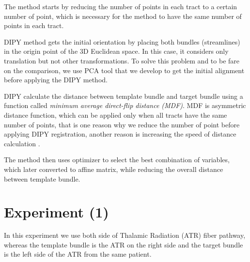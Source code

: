 \documentclass[../structure.tex]{subfiles}
\begin{document}
The method starts by reducing the number of points in each tract to a certain number of point, which is necessary for the method to have the same number of points in each tract.

DIPY method gets the initial orientation by placing both bundles (streamlines) in the origin point of the 3D Euclidean space. In this case, it considers only translation but not other transformations. To solve this problem and to be fare on the comparison, we use PCA tool that we develop to get the initial alignment before applying the DIPY method.

DIPY calculate the distance between template bundle and target bundle using a function called \textit{minimum average direct-flip distance (MDF)}. MDF is asymmetric
distance function, which can be applied only when all tracts have the same number of points, that is one reason why we reduce the number of point before applying DIPY registration, another reason is increasing the speed of distance calculation \cite{Garyfallidis2012}.

The method then uses optimizer to select the best combination of variables, which later converted to affine matrix, while reducing the overall distance between template bundle.

\begin{comment}
\section{Testing steps}
\begin{itemize}
\item Read bundles from \textit{ply} files
\item Apply PCA and visually inspect the alignment result
\item If the visual inspection was positive and PCA improved the alignment, we consider its result, otherwise we just flip the template bundle or consider the original orientation
\item Generate distances histogram between two bundles to select the distance threshold
\item Start the registration and iterate until there is no more improvement on the alignment
\end{itemize}
\end{comment}

\section{Experiment (1)}
\hspace{2em}In this experiment we use both side of Thalamic Radiation (ATR) fiber pathway, whereas the template bundle is the ATR on the right side and the target bundle is the left side of the ATR from the same patient.
\end{document}

